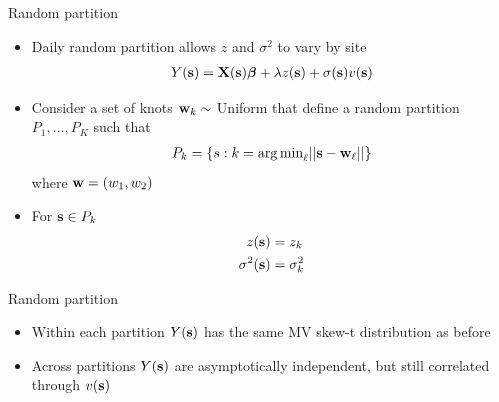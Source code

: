 \documentclass{beamer}
\begin{document}
\begin{frame}{Random partition}
  \begin{itemize} \setlength{\itemsep}{0.5em}
    \item Daily random partition allows $z$ and $\sigma^2$ to vary by site
    \begin{align*}
      Y(\mbox{\bf s}) = \mbox{\bf X}(\mbox{\bf s}) \mbox{\boldmath $\beta$} + \lambda z(\mbox{\bf s}) + \sigma(\mbox{\bf s}) v(\mbox{\bf s})
    \end{align*}
    \item Consider a set of knots $\mbox{\bf w}_{k} \sim$ Uniform that define a random partition
    $P_{1}, \ldots, P_{K}$ such that
    \begin{align*}
      P_{k} = \{s : k = {\mathop{\rm arg\, min}}_\ell|| \mbox{\bf s} - \mbox{\bf w}_{\ell}|| \}
    \end{align*}
    where $\mbox{\bf w} = (w_1, w_2)$
    \item For $\mbox{\bf s} \in P_{k}$
    \begin{align*}
      z(\mbox{\bf s}) &= z_{k}\\
      \sigma^2(\mbox{\bf s}) &= \sigma^2_{k}
    \end{align*}
  \end{itemize}
\end{frame}

\begin{frame}{Random partition}
  \begin{itemize} \setlength{\itemsep}{0.5em}
    \item Within each partition $Y(\mbox{\bf s})$ has the same MV skew-t distribution as before
    \item Across partitions $Y(\mbox{\bf s})$ are asymptotically independent, but still correlated through $v(\mbox{\bf s})$
  \end{itemize}
\end{frame}
\end{document}
